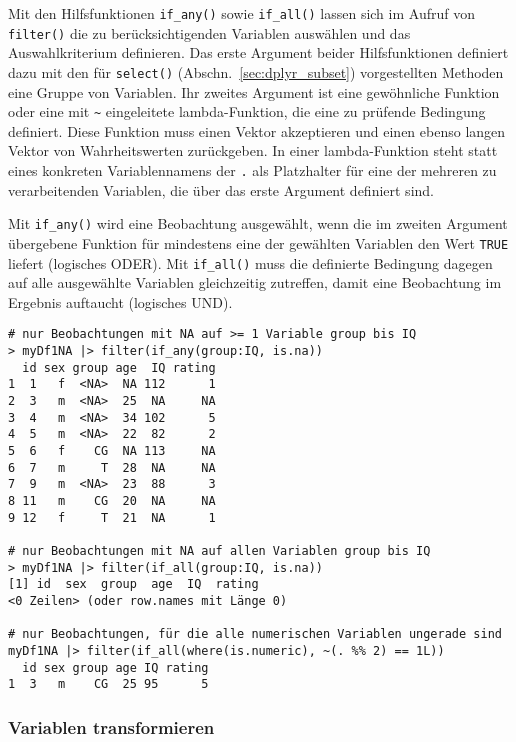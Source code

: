 Mit den Hilfsfunktionen \lstinline!if_any()! sowie \lstinline!if_all()! lassen sich im Aufruf von \lstinline!filter()! die zu berücksichtigenden Variablen auswählen und das Auswahlkriterium definieren. Das erste Argument beider Hilfsfunktionen definiert dazu mit den für \lstinline!select()! (Abschn.\ \ref{sec:dplyr_subset}) vorgestellten Methoden eine Gruppe von Variablen. Ihr zweites Argument ist eine gewöhnliche Funktion oder eine mit \lstinline!~! eingeleitete lambda-Funktion, die eine zu prüfende Bedingung definiert. Diese Funktion muss einen Vektor akzeptieren und einen ebenso langen Vektor von Wahrheitswerten zurückgeben. In einer lambda-Funktion steht statt eines konkreten Variablennamens der \lstinline!.! als Platzhalter für eine der mehreren zu verarbeitenden Variablen, die über das erste Argument definiert sind.

Mit \lstinline!if_any()! wird eine Beobachtung ausgewählt, wenn die im zweiten Argument übergebene Funktion für mindestens eine der gewählten Variablen den Wert \lstinline!TRUE! liefert (logisches ODER). Mit \lstinline!if_all()! muss die definierte Bedingung dagegen auf alle ausgewählte Variablen gleichzeitig zutreffen, damit eine Beobachtung im Ergebnis auftaucht (logisches UND).
\begin{lstlisting}
# nur Beobachtungen mit NA auf >= 1 Variable group bis IQ
> myDf1NA |> filter(if_any(group:IQ, is.na))
  id sex group age  IQ rating
1  1   f  <NA>  NA 112      1
2  3   m  <NA>  25  NA     NA
3  4   m  <NA>  34 102      5
4  5   m  <NA>  22  82      2
5  6   f    CG  NA 113     NA
6  7   m     T  28  NA     NA
7  9   m  <NA>  23  88      3
8 11   m    CG  20  NA     NA
9 12   f     T  21  NA      1

# nur Beobachtungen mit NA auf allen Variablen group bis IQ
> myDf1NA |> filter(if_all(group:IQ, is.na))
[1] id  sex  group  age  IQ  rating
<0 Zeilen> (oder row.names mit Länge 0)

# nur Beobachtungen, für die alle numerischen Variablen ungerade sind
myDf1NA |> filter(if_all(where(is.numeric), ~(. %% 2) == 1L))
  id sex group age IQ rating
1  3   m    CG  25 95      5
\end{lstlisting}

\subsubsection{Variablen transformieren}

